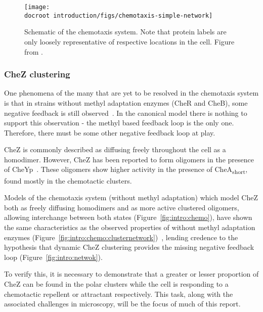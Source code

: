 \documentclass[../main.tex]{subfiles}
\begin{document}
\begin{figure}[h!]
\begin{center}
\texttt{[image: \\docroot introduction/figs/chemotaxis-simple-network]}
\caption[Schematic of the chemotaxis system]{Schematic of the chemotaxis system. Note that protein labels are only loosely representative of respective locations in the cell. Figure from \citet{lipkowfigs}.}
\label{fig:chemo:bubble}
\end{center}
\end{figure}

\subsubsection{CheZ clustering}

One phenomena of the many that are yet to be resolved in the \ecoli chemotaxis system is that in strains without methyl adaptation enzymes (CheR and CheB), some negative feedback is still observed~\citep{stock85}. In the canonical model there is nothing to support this observation - the methyl based feedback loop is the only one. Therefore, there must be some other negative feedback loop at play.

CheZ is commonly described as diffusing freely throughout the cell as a homodimer. However, CheZ has been reported to form oligomers in the presence of CheYp~\citep{blat95, blat98}. These oligomers show higher activity in the presence of CheA\textsubscript{short}, found mostly in the chemotactic clusters.

Models of the chemotaxis system (without methyl adaptation) which model CheZ both as freely diffusing homodimers and as more active clustered oligomers, allowing interchange between both states (Figure~\ref{fig:intro:chemo}), have shown the same characteristics as the observed properties of \ecoli without methyl adaptation enzymes (Figure~\ref{fig:intro:chemo:clusternetwork})~\citep{lipkowfigs}, lending credence to the hypothesis that dynamic CheZ clustering provides the missing negative feedback loop (Figure~\ref{fig:intro:netwok}).

To verify this, it is necessary to demonstrate that a greater or lesser proportion of CheZ can be found in the polar clusters while the cell is responding to a chemotactic repellent or attractant respectively. This task, along with the associated challenges in microscopy, will be the focus of much of this report.
\end{document}
